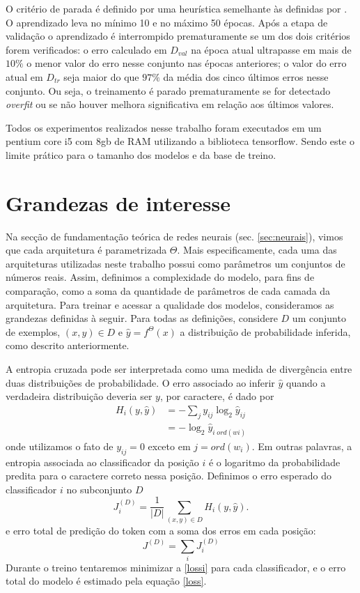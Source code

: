 O critério de parada é definido por uma heurística semelhante às definidas por \cite{lutz_early_stop}. O aprendizado leva no mínimo 10 e no máximo 50 épocas. Após a etapa de validação o aprendizado é interrompido prematuramente se um dos dois critérios forem verificados: o erro calculado em $D_{val}$ na época atual ultrapasse em mais de $10\%$ o menor valor do erro nesse conjunto nas épocas anteriores; o valor do erro atual em $D_{tr}$ seja maior do que $97\%$ da média dos cinco últimos erros nesse conjunto. Ou seja, o treinamento é parado prematuramente se for detectado \textit{overfit} ou se não houver melhora significativa em relação aos últimos valores.

Todos os experimentos realizados nesse trabalho foram executados em um pentium core i5 com 8gb de RAM utilizando a biblioteca tensorflow. Sendo este o limite prático para o tamanho dos modelos e da base de treino. 

\section{Grandezas de interesse}

Na secção de fundamentação teórica de redes neurais (sec. \ref{sec:neurais}), vimos que cada arquitetura é parametrizada $\Theta$. Mais especificamente, cada uma das arquiteturas utilizadas neste trabalho possui como parâmetros um conjuntos de números reais. Assim, definimos a complexidade do modelo, para fins de comparação, como a soma da quantidade de parâmetros de cada camada da arquitetura. Para treinar e acessar a qualidade dos modelos, consideramos as grandezas definidas à seguir. Para todas as definições, considere $D$ um conjunto de exemplos, $(x,y) \in D$ e $\hat{y} = f^{\Theta}(x)$ a distribuição de probabilidade inferida, como descrito anteriormente. 

A entropia cruzada pode ser interpretada como uma medida de divergência entre duas distribuições de probabilidade. O erro associado ao inferir $\hat{y}$ quando a verdadeira distribuição deveria ser $y$, por caractere, é dado por
\begin{align}
	H_i(y, \hat{y}) &= -\sum_j y_{ij} \log_2{\hat{y}_{ij}} \\
					&= -\log_2{\hat{y}_{i\;ord(wi)}}
\end{align}
onde utilizamos o fato de $y_{ij} = 0$ exceto em $j = ord(w_i)$. Em outras palavras, a entropia associada ao classificador da posição $i$ é o logaritmo da probabilidade predita para o caractere correto nessa posição. Definimos o erro esperado do classificador $i$ no subconjunto $D$  
\begin{equation} \label{lossi} 
	J_i^{(D)} = \frac{1}{|D|} \sum_{(x,y) \in D} H_i(y, \hat{y}).
\end{equation}
e erro total de predição do token com a soma dos erros em cada posição:
\begin{equation} \label{loss}
	J^{(D)} = \sum_{i} J_i^{(D)}
\end{equation}
Durante o treino tentaremos minimizar a \ref{lossi} para cada classificador, e o erro total do modelo é estimado pela equação \ref{loss}.

